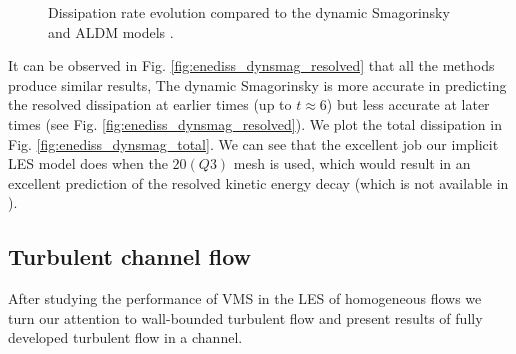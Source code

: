 \begin{figure}[h!]
	\centering	
	\caption{Dissipation rate evolution compared to the dynamic Smagorinsky \cite{fauconnier_construction_2009} and ALDM models \cite{hickel_adaptive_2006}.}
	\label{fig:enediss_dynsmag}
\end{figure}

It can be observed in Fig. \ref{fig:enediss_dynsmag_resolved} that all the methods produce similar results, %
The dynamic Smagorinsky is more accurate in predicting the resolved dissipation at earlier times (up to $t\approx{}6$) but less accurate at later times (see Fig. \ref{fig:enediss_dynsmag_resolved}). 
We plot the total dissipation in Fig. \ref{fig:enediss_dynsmag_total}. We can see that the excellent job our implicit LES model does when the $20 (Q3)$ mesh is used, which would result in an excellent prediction of the resolved kinetic energy decay (which is not available in \cite{hickel_adaptive_2006}). 

\subsection{Turbulent channel flow}
\label{sec-C4_TCF}
After studying the performance of VMS in the LES of homogeneous flows we turn our attention to wall-bounded turbulent flow and present results of fully developed turbulent flow in a channel.

